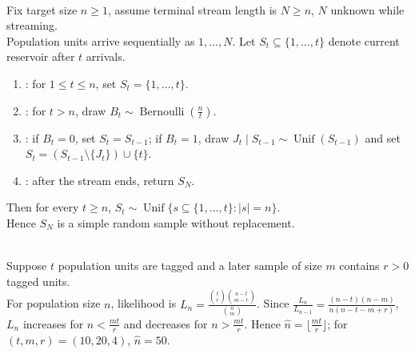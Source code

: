 \begin{method} \label{meth:reservoir-sampling-simple-random-sample} \\
Fix target size $n\geq1$, assume terminal stream length is $N\geq n$, $N$ unknown while streaming.\\
Population units arrive sequentially as $1,\ldots,N$. Let $S_t\subseteq\{1,\ldots,t\}$ denote current reservoir after $t$ arrivals.
\begin{enumerate}[label=(\roman*)]
\setlength{\itemsep}{0pt}
\item {}: for $1\leq t\leq n$, set $S_t=\{1,\ldots,t\}$.
\item {}: for $t>n$, draw $B_t\sim\operatorname{Bernoulli}(\frac{n}{t})$.
\item {}: if $B_t=0$, set $S_t=S_{t-1}$; if $B_t=1$, draw $J_t\mid S_{t-1}\sim\operatorname{Unif}(S_{t-1})$ and set $S_t=(S_{t-1}\setminus\{J_t\})\cup\{t\}$.
\item {}: after the stream ends, return $S_N$.
\end{enumerate}
Then for every $t\geq n$, $S_t\sim\operatorname{Unif}\{s\subseteq\{1,\ldots,t\}:|s|=n\}$.\\
Hence $S_N$ is a simple random sample without replacement.
\end{method}

\begin{example} \label{ex:capture-recapture-hypergeometric-likelihood} \\
Suppose $t$ population units are tagged and a later sample of size $m$ contains $r>0$ tagged units.\\
For population size $n$, likelihood is $L_n=\frac{\binom{t}{r}\binom{n-t}{m-r}}{\binom{n}{m}}$. Since $\frac{L_n}{L_{n-1}}=\frac{(n-t)(n-m)}{n(n-t-m+r)}$, $L_n$ increases for $n<\frac{mt}{r}$ and decreases for $n>\frac{mt}{r}$. Hence $\widehat n=\lfloor \frac{mt}{r}\rfloor$; for $(t,m,r)=(10,20,4)$, $\widehat n=50$.
\end{example}

